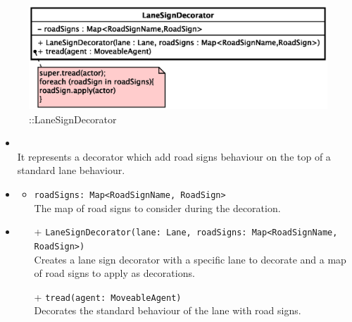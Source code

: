 \begin{figure}[h]
\centering
\includegraphics[scale=0.6,keepaspectratio]{images/solution/app/backend/lane_sign_decorator.eps}
\caption{\pReactiveComponentLaneDecoration::LaneSignDecorator}
\label{fig:sd-app-lane_sign_decorator}
\end{figure}
\FloatBarrier
\begin{itemize}
  \item \textbf{\descr} \\
    It represents a decorator which add road signs behaviour on the top of a standard lane behaviour. 
  \item \textbf{\attrs}
  \begin{itemize}
    \item \texttt{roadSigns: Map<RoadSignName, RoadSign>} \\
The map of road signs to consider during the decoration.
  \end{itemize}
  \item \textbf{\ops}
   \begin{itemize} 
   \item[+] \texttt{LaneSignDecorator(lane: Lane, roadSigns: Map<RoadSignName, RoadSign>)} \\
Creates a lane sign decorator with a specific lane to decorate and a map of road signs to apply as decorations.
    \item[+] \texttt{tread(agent: MoveableAgent)} \\
Decorates the standard behaviour of the lane with road signs.  
  \end{itemize}
\end{itemize}
